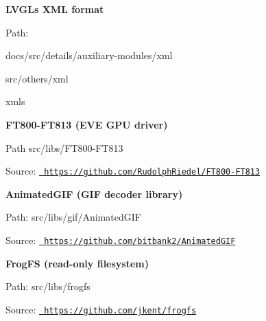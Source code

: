 {\bfseries{LVGL\textquotesingle{}s XML format}}
\begin{DoxyItemize}
\item Path\+:
\begin{DoxyItemize}
\item docs/src/details/auxiliary-\/modules/xml
\item src/others/xml
\item xmls
\end{DoxyItemize}
\end{DoxyItemize}

{\bfseries{FT800-\/\+FT813 (EVE GPU driver)}}
\begin{DoxyItemize}
\item Path src/libs/\+FT800-\/\+FT813
\item Source\+: \href{https://github.com/RudolphRiedel/FT800-FT813}{\texttt{ https\+://github.\+com/\+Rudolph\+Riedel/\+FT800-\/\+FT813}}
\end{DoxyItemize}

{\bfseries{Animated\+GIF (GIF decoder library)}}
\begin{DoxyItemize}
\item Path\+: src/libs/gif/\+Animated\+GIF
\item Source\+: \href{https://github.com/bitbank2/AnimatedGIF}{\texttt{ https\+://github.\+com/bitbank2/\+Animated\+GIF}}
\end{DoxyItemize}

{\bfseries{Frog\+FS (read-\/only filesystem)}}
\begin{DoxyItemize}
\item Path\+: src/libs/frogfs
\item Source\+: \href{https://github.com/jkent/frogfs}{\texttt{ https\+://github.\+com/jkent/frogfs}} 
\end{DoxyItemize}